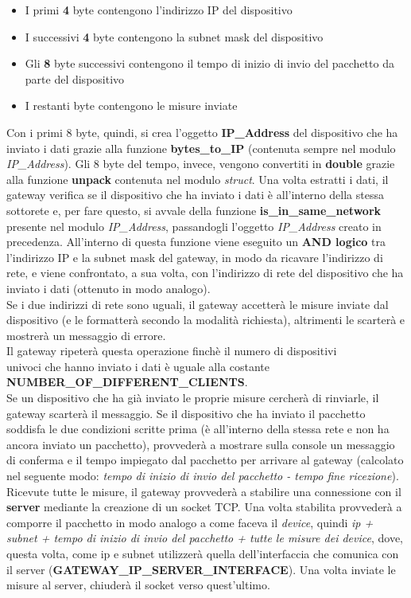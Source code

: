 \documentclass[a4paper, 14pt]{extreport}
\begin{document}
    \begin{itemize}
        \item I primi \textbf{4} byte contengono l'indirizzo IP del dispositivo
        \item I successivi \textbf{4} byte contengono la subnet mask del dispositivo
        \item Gli \textbf{8} byte successivi contengono il tempo di inizio di invio del pacchetto da parte del dispositivo
        \item I restanti byte contengono le misure inviate
    \end{itemize}

    Con i primi 8 byte, quindi, si crea l'oggetto \textbf{IP\_Address} del dispositivo che ha inviato i dati
    grazie alla funzione \textbf{bytes\_to\_IP} (contenuta sempre nel modulo \emph{IP\_Address}).
    Gli 8 byte del tempo, invece, vengono convertiti in \textbf{double} grazie alla funzione \textbf{unpack}
    contenuta nel modulo \emph{struct}.
    Una volta estratti i dati, il gateway verifica se il dispositivo che ha inviato i dati è
    all'interno della stessa sottorete e, per fare questo, si avvale della funzione
    \textbf{is\_in\_same\_network} presente nel modulo \emph{IP\_Address}, passandogli l'oggetto
    \emph{IP\_Address} creato in precedenza.
    All'interno di questa funzione viene eseguito un \textbf{AND logico} tra l'indirizzo IP e la subnet mask
    del gateway, in modo da ricavare l'indirizzo di rete, e viene confrontato, a sua volta, con l'indirizzo di rete
    del dispositivo che ha inviato i dati (ottenuto in modo analogo). \\
    Se i due indirizzi di rete sono uguali, il
    gateway accetterà le misure inviate dal dispositivo (e le formatterà secondo la modalità richiesta), altrimenti le scarterà e mostrerà un messaggio di errore. \\
    Il gateway ripeterà questa operazione finchè il numero di dispositivi \\ 
    univoci che hanno inviato i dati è uguale alla costante  \\
    \textbf{NUMBER\_OF\_DIFFERENT\_CLIENTS}.   \\
    Se un dispositivo che ha già inviato le proprie misure cercherà di rinviarle, il gateway scarterà il messaggio.
    Se il dispositivo che ha inviato il pacchetto soddisfa le due condizioni scritte prima
    (è all'interno della stessa rete e non ha ancora inviato un pacchetto), provvederà a 
    mostrare sulla console un messaggio di conferma e il tempo impiegato dal pacchetto per 
    arrivare al gateway (calcolato nel seguente modo: \emph{tempo di inizio di invio del pacchetto - tempo fine ricezione}).
    Ricevute tutte le misure, il gateway provvederà a stabilire una connessione con il \textbf{server} mediante la
    creazione di un socket TCP.
    Una volta stabilita provvederà a comporre il pacchetto in modo analogo a come faceva il \emph{device},
    quindi \emph{ip + subnet + tempo di inizio di invio del pacchetto + tutte le misure dei device}, 
    dove, questa volta, come ip e subnet utilizzerà quella dell'interfaccia che comunica con il server
    (\textbf{GATEWAY\_IP\_SERVER\_INTERFACE}).
    Una volta inviate le misure al server, chiuderà il socket verso quest'ultimo.
\end{document}
